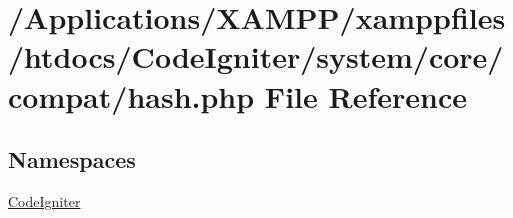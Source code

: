 \hypertarget{hash_8php}{}\section{/\+Applications/\+X\+A\+M\+P\+P/xamppfiles/htdocs/\+Code\+Igniter/system/core/compat/hash.php File Reference}
\label{hash_8php}
\subsection*{Namespaces}
\begin{DoxyCompactItemize}
\item 
 \mbox{\hyperlink{namespace_code_igniter}{Code\+Igniter}}
\end{DoxyCompactItemize}
